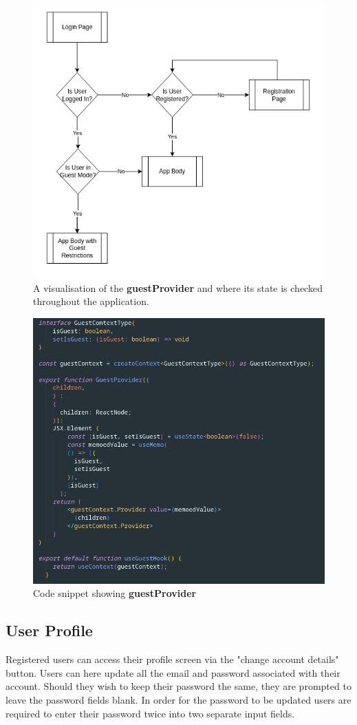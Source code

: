 \documentclass{l4proj}
\begin{document}
\begin{figure}[ht]
    \centering
    \includegraphics[width=0.6\linewidth]{images/loginFlow.pdf}    

    \caption{A visualisation of the \textbf{guestProvider} and where its state is checked throughout the application.
    }

    \label{fig:flow} 
\end{figure}

\begin{figure}[ht]
    \centering
    \includegraphics[width=0.6\linewidth]{images/guestProvider.pdf}    

    \caption{Code snippet showing \textbf{guestProvider}}

    \label{fig:fguestProvider} 
\end{figure}

\subsection{User Profile}
Registered users can access their profile screen via the "change account details" button. Users can here update all the email and password associated with their account. Should they wish to keep their password the same,  they are prompted to leave the password fields blank. In order for the password to be updated users are required to enter their password twice into two separate input fields.
\end{document}
